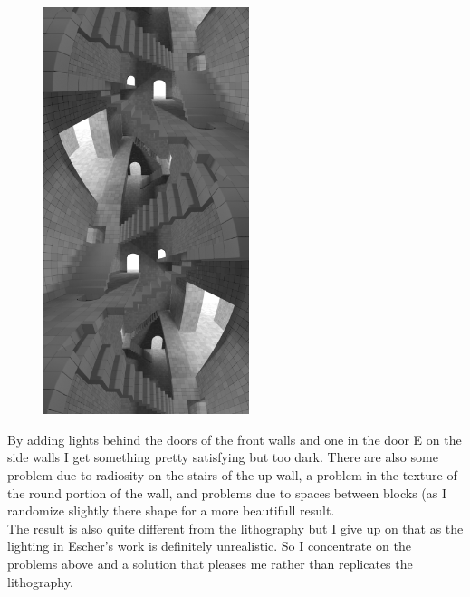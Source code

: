 \documentclass[12pt, a4paper]{article}
\begin{document}
\begin{center}
\begin{figure}[H]
\centering
\includegraphics[width=6cm]{./XL-51_14.png}\\
\end{figure}
\end{center}

By adding lights behind the doors of the front walls and one in the door E on the side walls I get something pretty satisfying but too dark. There are also some problem due to radiosity on the stairs of the up wall, a problem in the texture of the round portion of the wall, and problems due to spaces between blocks (as I randomize slightly there shape for a more beautifull result.\\

The result is also quite different from the lithography but I give up on that as the lighting in Escher's work is definitely unrealistic. So I concentrate on the problems above and a solution that pleases me rather than replicates the lithography.\\
\end{document}
